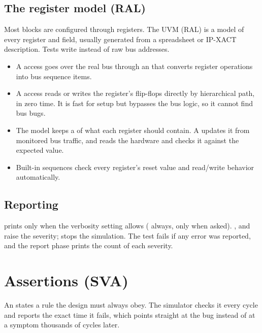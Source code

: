 \subsection*{The register model (RAL)}

Most blocks are configured through registers. The UVM  (RAL) is a model of every register and field, usually generated from a spreadsheet or IP-XACT description. Tests write  instead of raw bus addresses.
\begin{itemize}
  \item A  access goes over the real bus through an  that converts register operations into bus sequence items.
  \item A  access reads or writes the register's flip-flops directly by hierarchical path, in zero time. It is fast for setup but bypasses the bus logic, so it cannot find bus bugs.
  \item The model keeps a  of what each register should contain. A  updates it from monitored bus traffic, and  reads the hardware and checks it against the expected value.
  \item Built-in sequences check every register's reset value and read/write behavior automatically.
\end{itemize}

\subsection*{Reporting}

 prints only when the verbosity setting allows ( always,  only when asked). ,  and  raise the severity;  stops the simulation. The test fails if any error was reported, and the report phase prints the count of each severity.

\section{Assertions (SVA)}

An  states a rule the design must always obey. The simulator checks it every cycle and reports the exact time it fails, which points straight at the bug instead of at a symptom thousands of cycles later.

